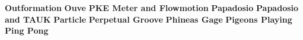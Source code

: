 \vspace{10pt} 
\newline
\vspace{10pt} 
\noindent \textbf{Outformation}\newline
\vspace{10pt} 
\newline
\vspace{10pt} 
\noindent \textbf{Ouve}\newline
\vspace{10pt} 
\newline
\vspace{10pt} 
\noindent \textbf{PKE Meter and Flowmotion}\newline
\vspace{10pt} 
\newline
\vspace{10pt} 
\noindent \textbf{Papadosio}\newline
\vspace{10pt} 
\newline
\vspace{10pt} 
\noindent \textbf{Papadosio and TAUK}\newline
\vspace{10pt} 
\newline
\vspace{10pt} 
\noindent \textbf{Particle}\newline
\vspace{10pt} 
\newline
\vspace{10pt} 
\noindent \textbf{Perpetual Groove}\newline
\vspace{10pt} 
\newline
\vspace{10pt} 
\noindent \textbf{Phineas Gage}\newline
\vspace{10pt} 
\newline
\vspace{10pt} 
\noindent \textbf{Pigeons Playing Ping Pong}\newline
\vspace{10pt} 
\newline
